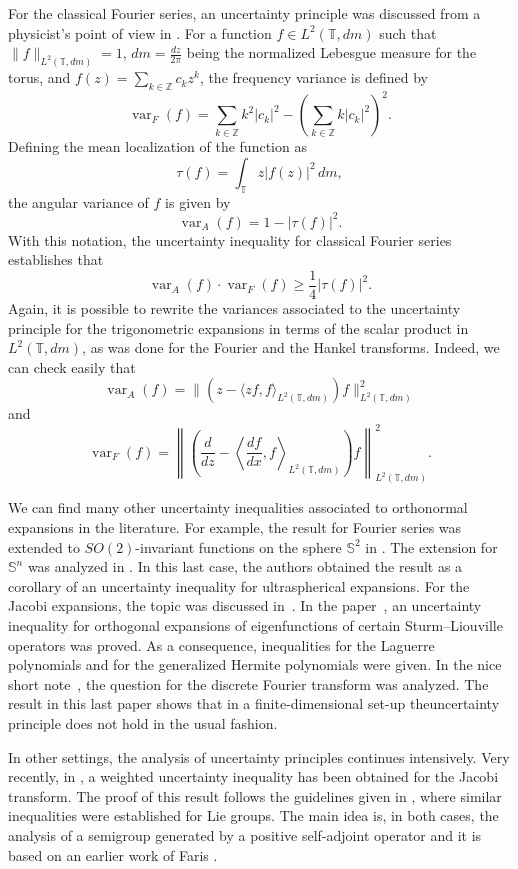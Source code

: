 \documentclass[a4paper]{amsart}
\theoremstyle{plain}
\theoremstyle{definition}
\newcommand{\var}{\operatorname{var}}
\begin{document}
For the classical Fourier series, an uncertainty principle was discussed from a physicist's point of view in \cite{Brei}. For a function $f\in L^2(\mathbb{T},dm)$ such that $\|f\|_{L^2(\mathbb{T},dm)}=1$, $dm=\frac{dz}{2\pi}$ being the normalized Lebesgue measure for the torus, and $f(z)=\sum_{k\in \mathbb{Z}}c_k z^k$, the frequency variance is defined by
\[
\var_F(f)=\sum_{k\in \mathbb{Z}}k^2|c_k|^2-\left(\sum_{k\in \mathbb{Z}}k|c_k|^2\right)^2.
\]
Defining the mean localization of the function as
\[
\tau(f)=\int_{\mathbb{T}}z|f(z)|^2\,dm,
\]
the angular variance of $f$ is given by
\[
\var_A(f)=1-|\tau(f)|^2.
\]
With this notation, the uncertainty inequality for classical Fourier series establishes that
\begin{equation}
\label{eq:incerFourier}
\var_A(f)\cdot \var_F(f)\ge \frac14 |\tau(f)|^2.
\end{equation}
Again, it is possible to rewrite the variances associated to the uncertainty principle for the trigonometric expansions in terms of the scalar product in $L^2(\mathbb{T},dm)$, as was done for the Fourier and the Hankel transforms. Indeed, we can check easily that
\[
\var_A(f) = \|(z-\langle z f,f\rangle_{L^2(\mathbb{T},dm)})f\|^2_{L^2(\mathbb{T},dm)}
\]
and
\[
\var_F(f) = \left\| \left(\frac{d}{dz}
- \left\langle\frac{df}{dx},
f\right\rangle_{L^2(\mathbb{T},dm)}\right)f \right\|_{L^2(\mathbb{T},dm)}^2.
\]

We can find many other uncertainty inequalities associated to
orthonormal expansions in the literature. For example, the result
for Fourier series was extended to $SO(2)$-invariant functions on
the sphere $\mathbb{S}^2$ in \cite{Narco-Ward}. The extension for
$\mathbb{S}^n$ was analyzed in \cite{Rosler-Voit1}. In this last
case, the authors obtained the result as a corollary of an
uncertainty inequality for ultraspherical expansions. For the
Jacobi expansions, the topic was discussed in~\cite{Li-Liu}. In
the paper~\cite{Li-Liu2}, an uncertainty inequality for orthogonal
expansions of eigenfunctions of certain Sturm--Liouville operators
was proved. As a consequence, inequalities for the Laguerre
polynomials and for the generalized Hermite polynomials were
given. In the nice short note~\cite{Grun}, the question for 
the discrete Fourier transform was analyzed. 
The result in this last paper shows that in a finite-dimensional 
set-up theuncertainty principle does not hold in the usual fashion.

In other settings, the analysis of uncertainty principles
continues intensively. Very recently, in \cite{Ma}, a weighted
uncertainty inequality has been obtained for the Jacobi transform.
The proof of this result follows the guidelines given in
\cite{Ciatti-Ricci-Sundari}, where similar inequalities were
established for Lie groups. The main idea is, in both cases, the
analysis of a semigroup generated by a positive self-adjoint
operator and it is based on an earlier work of Faris \cite{Faris}.
\end{document}
